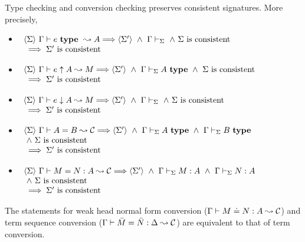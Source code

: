 \begin{lemma} \label{lemTypeCheckConsistent}
Type checking and conversion checking preserves consistent signatures.
\if {}
More precisely,
    \begin{itemize}

	\item
	    $\begin{array}[t]{l}
		\langle {\Sigma} \rangle ~ {{\Gamma} \vdash {e} ~ \mathbf{type} ~ \leadsto {A}} \Longrightarrow \langle {\Sigma'} \rangle
		~ \wedge ~ {\Gamma} \vdash_{\Sigma}
		~ \wedge ~ \mbox{$\Sigma$ is consistent}
		\\ {} \implies \mbox{$\Sigma'$ is consistent}
	    \end{array}$

	\item
	    $\begin{array}[t]{l}
		\langle {\Sigma} \rangle ~ {{\Gamma} \vdash {e} \uparrow {A} \leadsto {M}} \Longrightarrow \langle {\Sigma'} \rangle
		~ \wedge ~ {\Gamma} \vdash_{\Sigma}A ~ \mathbf{type}
		~ \wedge ~ \mbox{$\Sigma$ is consistent}
		\\ {} \implies \mbox{$\Sigma'$ is consistent}
	    \end{array}$

	\item
	    $\begin{array}[t]{l}
		\langle {\Sigma} \rangle ~ {{\Gamma} \vdash {e} \downarrow {A} \leadsto {M}} \Longrightarrow \langle {\Sigma'} \rangle
		~ \wedge ~ {\Gamma} \vdash_{\Sigma}
		~ \wedge ~ \mbox{$\Sigma$ is consistent}
		\\ {} \implies \mbox{$\Sigma'$ is consistent}
	    \end{array}$

	\item
	    $\begin{array}[t]{l}
		\langle {\Sigma} \rangle ~ {{\Gamma} \vdash {A} = {B} \leadsto {\mathcal{C}}} \Longrightarrow \langle {\Sigma'} \rangle
		~ \wedge ~ {\Gamma} \vdash_{\Sigma}A ~ \mathbf{type}
		~ \wedge ~ {\Gamma} \vdash_{\Sigma}B ~ \mathbf{type} \\
		~ \wedge ~ \mbox{$\Sigma$ is consistent}
		\\ {} \implies \mbox{$\Sigma'$ is consistent}
	    \end{array}$

	\item
	    $\begin{array}[t]{l}
		\langle {\Sigma} \rangle ~ {{\Gamma} \vdash {M} = {N} : {A} \leadsto {\mathcal{C}}} \Longrightarrow \langle {\Sigma'} \rangle
		~ \wedge ~ {\Gamma} \vdash_{\Sigma} {M} : {A}
		~ \wedge ~ {\Gamma} \vdash_{\Sigma} {N} : {A} \\
		~ \wedge ~ \mbox{$\Sigma$ is consistent}
		\\ {} \implies \mbox{$\Sigma'$ is consistent}
	    \end{array}$

    \end{itemize}

    The statements for weak head normal form conversion (${\Gamma} \vdash {M} \doteq {N} : {A} \leadsto {\mathcal{C}}$) and term sequence conversion (${\Gamma} \vdash {\bar M} = {\bar N} : {\Delta} \leadsto {\mathcal{C}}$)
    are equivalent to that of term conversion.
\fi
\end{lemma}

